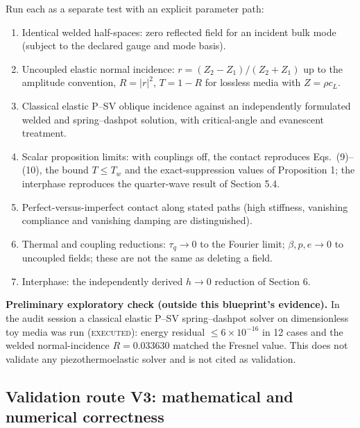 \documentclass[11pt]{article}
\begin{document}
Run each as a separate test with an explicit parameter path:
\begin{enumerate}
  \item Identical welded half-spaces: zero reflected field for an incident bulk
    mode (subject to the declared gauge and mode basis).
  \item Uncoupled elastic normal incidence: $r=(Z_2-Z_1)/(Z_2+Z_1)$ up to the
    amplitude convention, $R=\lvert r\rvert^2$, $T=1-R$ for lossless media with
    $Z=\rho c_L$.
  \item Classical elastic P--SV oblique incidence against an independently
    formulated welded and spring--dashpot solution, with critical-angle and
    evanescent treatment.
  \item Scalar proposition limits: with couplings off, the contact reproduces
    Eqs.\ (9)--(10), the bound $T\le T_w$ and the exact-suppression values of
    Proposition 1; the interphase reproduces the quarter-wave result of
    Section 5.4.
  \item Perfect-versus-imperfect contact along stated paths (high stiffness,
    vanishing compliance and vanishing damping are distinguished).
  \item Thermal and coupling reductions: $\tau_q\to0$ to the Fourier limit;
    $\beta,p,e\to0$ to uncoupled fields; these are not the same as deleting a
    field.
  \item Interphase: the independently derived $h\to0$ reduction of Section 6.
\end{enumerate}

\textbf{Preliminary exploratory check (outside this blueprint's evidence).} In the
audit session a classical elastic P--SV spring--dashpot solver on dimensionless toy
media was run (\textsc{executed}): energy residual $\le6\times10^{-16}$ in 12 cases
and the welded normal-incidence $R=0.033630$ matched the Fresnel value. This does
not validate any piezothermoelastic solver and is not cited as validation.

\subsection{Validation route V3: mathematical and numerical correctness}
\end{document}
